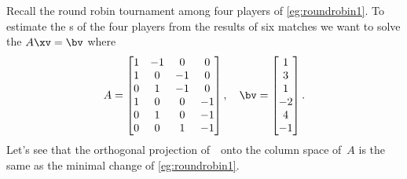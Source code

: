 \begin{example} \label{eg:roundrobin2}
Recall the round robin tournament among four players of \cref{eg:roundrobin1}.
To estimate the s of the four players from the results of six matches we want to solve the 
 \(A\xv=\bv\) where
\begin{equation*}
A=\begin{bmatrix}    1 & -1 & 0 & 0
\\ 1 & 0 & -1 & 0
\\ 0 & 1 & -1 & 0
\\ 1 & 0 & 0 & -1
\\ 0 & 1 & 0 & -1
\\ 0 & 0 & 1 & -1
 \end{bmatrix},\quad
 \bv=\begin{bmatrix} 1\\ 3\\ 1\\ -2\\ 4\\ -1 \end{bmatrix}.
\end{equation*}
Let's see that the orthogonal projection of~\bv\ onto the column space of~\(A\) is the same as the minimal change of \cref{eg:roundrobin1}.


\end{example}

